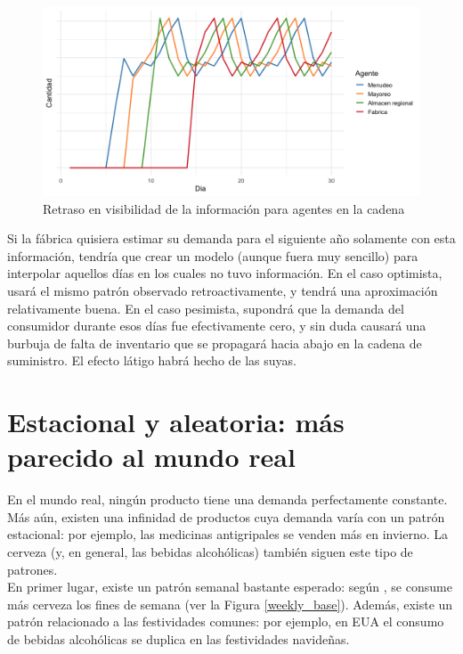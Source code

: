 \begin{figure}[ht!]
\caption{Retraso en visibilidad de la informaci\'on para agentes en la cadena}
\label{analytic_2}
\includegraphics[width=12cm]{tesis_tex/figs/analytic_solution_0_all_45_inv.png}
\centering
\end{figure}

Si la f\'abrica quisiera estimar su demanda para el siguiente a\~no solamente con esta informaci\'on, tendr\'ia que crear un modelo (aunque fuera muy sencillo) para interpolar aquellos d\'ias en los cuales no tuvo informaci\'on. En el caso optimista, usar\'a el mismo patr\'on observado retroactivamente, y tendr\'a una aproximaci\'on relativamente buena. En el caso pesimista, supondr\'a que la demanda del consumidor durante esos d\'ias fue efectivamente cero, y sin duda causar\'a una burbuja de falta de inventario que se propagar\'a hacia abajo en la cadena de suministro. El efecto l\'atigo habr\'a hecho de las suyas.\\

\section{Estacional y aleatoria: m\'as parecido al mundo real}

En el mundo real, ning\'un producto tiene una demanda perfectamente constante. M\'as a\'un, existen una infinidad de productos cuya demanda var\'ia con un patr\'on estacional: por ejemplo, las medicinas antigripales se venden m\'as en invierno. La cerveza (y, en general, las bebidas alcoh\'olicas) tambi\'en siguen este tipo de patrones.\\

En primer lugar, existe un patr\'on semanal bastante esperado: seg\'un \citet{gallupbeer}, se consume m\'as cerveza los fines de semana (ver la Figura \ref{weekly_base}). Adem\'as, existe un patr\'on relacionado a las festividades comunes: por ejemplo, en EUA el consumo de bebidas alcoh\'olicas se duplica en las festividades navide\~nas. \\

